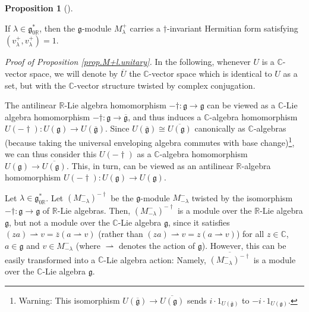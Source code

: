 \documentclass
[numbers=enddot,12pt,final,onecolumn,german,notitlepage]{scrartcl}%
\theoremstyle{definition}
\newtheorem{prop}[theo]{Proposition}
\newenvironment{proposition}[1][]
{\begin{prop}[#1]\begin{leftbar}}
{\end{leftbar}\end{prop}}
\begin{document}
\begin{proposition}
\label{prop.M+l.unitary}If $\lambda\in\mathfrak{g}_{0\mathbb{R}}^{\ast}$, then
the $\mathfrak{g}$-module $M_{\lambda}^{+}$ carries a $\dag$-invariant
Hermitian form satisfying $\left(  v_{\lambda}^{+},v_{\lambda}^{+}\right)  =1$.
\end{proposition}

\textit{Proof of Proposition \ref{prop.M+l.unitary}.} In the following,
whenever $U$ is a $\mathbb{C}$-vector space, we will denote by $\overline{U}$
the $\mathbb{C}$-vector space which is identical to $U$ as a set, but with the
$\mathbb{C}$-vector structure twisted by complex conjugation.

The antilinear $\mathbb{R}$-Lie algebra homomorphism $-\dag:\mathfrak{g}%
\rightarrow\mathfrak{g}$ can be viewed as a $\mathbb{C}$-Lie algebra
homomorphism $-\dag:\mathfrak{g}\rightarrow\overline{\mathfrak{g}}$, and thus
induces a $\mathbb{C}$-algebra homomorphism $U\left(  -\dag\right)  :U\left(
\mathfrak{g}\right)  \rightarrow U\left(  \overline{\mathfrak{g}}\right)  $.
Since $U\left(  \overline{\mathfrak{g}}\right)  \cong\overline{U\left(
\mathfrak{g}\right)  }$ canonically as $\mathbb{C}$-algebras (because taking
the universal enveloping algebra commutes with base change)\footnote{Warning:
This isomorphism $U\left(  \overline{\mathfrak{g}}\right)  \rightarrow
\overline{U\left(  \mathfrak{g}\right)  }$ sends $i\cdot1_{U\left(
\overline{\mathfrak{g}}\right)  }$ to $-i\cdot1_{U\left(  \mathfrak{g}\right)
}$.}, we can thus consider this $U\left(  -\dag\right)  $ as a $\mathbb{C}%
$-algebra homomorphism $U\left(  \mathfrak{g}\right)  \rightarrow
\overline{U\left(  \mathfrak{g}\right)  }$. This, in turn, can be viewed as an
antilinear $\mathbb{R}$-algebra homomorphism $U\left(  -\dag\right)  :U\left(
\mathfrak{g}\right)  \rightarrow U\left(  \mathfrak{g}\right)  $.

Let $\lambda\in\mathfrak{g}_{0\mathbb{R}}^{\ast}$. Let $\left(  M_{-\lambda
}^{-}\right)  ^{-\dag}$ be the $\mathfrak{g}$-module $M_{-\lambda}^{-}$
twisted by the isomorphism $-\dag:\mathfrak{g}\rightarrow\mathfrak{g}$ of
$\mathbb{R}$-Lie algebras. Then, $\left(  M_{-\lambda}^{-}\right)  ^{-\dag}$
is a module over the $\mathbb{R}$-Lie algebra $\mathfrak{g}$, but not a module
over the $\mathbb{C}$-Lie algebra $\mathfrak{g}$, since it satisfies $\left(
za\right)  \rightharpoonup v=\overline{z}\left(  a\rightharpoonup v\right)  $
(rather than $\left(  za\right)  \rightharpoonup v=z\left(  a\rightharpoonup
v\right)  $) for all $z\in\mathbb{C}$, $a\in\mathfrak{g}$ and $v\in
M_{-\lambda}^{-}$ (where $\rightharpoonup$ denotes the action of
$\mathfrak{g}$). However, this can be easily transformed into a $\mathbb{C}%
$-Lie algebra action: Namely, $\overline{\left(  M_{-\lambda}^{-}\right)
^{-\dag}}$ is a module over the $\mathbb{C}$-Lie algebra $\mathfrak{g}$.
\end{document}
